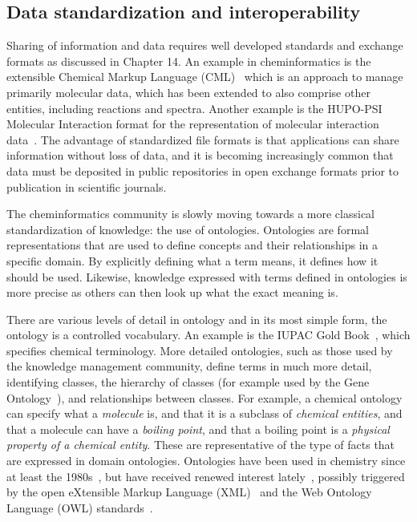 \documentclass[11pt]{book}
\begin{document}
\subsection{Data standardization and interoperability}

Sharing of information and data requires well developed standards and
exchange formats as discussed in Chapter 14.
An example in cheminformatics is the extensible Chemical Markup Language
(CML)~\cite{MurrayRust1999} which
is an approach to manage primarily molecular data, which has been extended to also
comprise other entities, including reactions and spectra. Another example is the HUPO-PSI
Molecular Interaction format for the representation of molecular interaction
data~\cite{Orchard:2010uq}. The advantage of standardized file formats is that
applications can share information without loss of data, and it is becoming
increasingly common that data must be deposited in public repositories in
open exchange formats prior to publication in scientific journals.

The cheminformatics community is slowly moving towards a more classical
standardization of knowledge: the use of ontologies. Ontologies are formal
representations that are used to define concepts and their relationships in a
specific domain. By explicitly defining what a term means, it defines how
it should be used. Likewise, knowledge expressed with terms defined in
ontologies is more precise as others can then look up what the exact meaning is.

There are various levels of detail in ontology and in its most
simple form, the ontology is a controlled vocabulary. An example is the IUPAC
Gold Book~\cite{url:goldbook}, which specifies chemical terminology.
More detailed ontologies, such as those used by the knowledge management community,
define terms in much more detail, identifying classes, the hierarchy of classes
(for example used by the Gene Ontology~\cite{GO2008,GO2010}), and relationships
between classes. For example, a chemical ontology can specify what a \textit{molecule}
is, and that it is a subclass of \textit{chemical entities}, and that a molecule can have
a \textit{boiling point}, and that a boiling point is a \textit{physical property of
a chemical entity}. These are representative of the type of facts
that are expressed in domain ontologies.
Ontologies have been used in chemistry since at least the 1980s~\cite{Gordon1983},
but have received renewed interest lately~\cite{Feldman2005,Dumontier2009,Sankar2010},
possibly triggered by the open eXtensible Markup Language (XML)~\cite{Bray:08:EML}
and the Web Ontology Language (OWL) standards~\cite{Group:09:OWO}.
\end{document}
